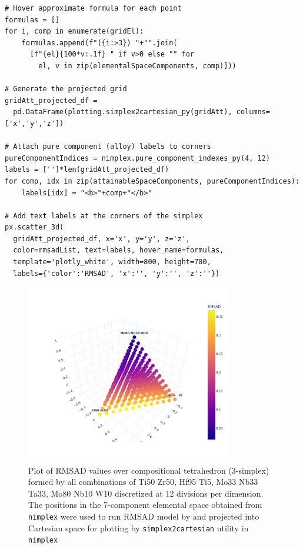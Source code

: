 \begin{verbatim}
# Hover approximate formula for each point
formulas = []
for i, comp in enumerate(gridEl):
    formulas.append(f"({i:>3}) "+"".join(
      [f"{el}{100*v:.1f} " if v>0 else "" for 
        el, v in zip(elementalSpaceComponents, comp)]))

# Generate the projected grid
gridAtt_projected_df = 
  pd.DataFrame(plotting.simplex2cartesian_py(gridAtt), columns=['x','y','z'])

# Attach pure component (alloy) labels to corners
pureComponentIndices = nimplex.pure_component_indexes_py(4, 12)
labels = ['']*len(gridAtt_projected_df)
for comp, idx in zip(attainableSpaceComponents, pureComponentIndices):
    labels[idx] = "<b>"+comp+"</b>"

# Add text labels at the corners of the simplex
px.scatter_3d(
  gridAtt_projected_df, x='x', y='y', z='z', 
  color=rmsadList, text=labels, hover_name=formulas,
  template='plotly_white', width=800, height=700, 
  labels={'color':'RMSAD', 'x':'', 'y':'', 'z':''})
\end{verbatim}

\begin{figure}[H]
    \centering
    \includegraphics[width=0.8\textwidth]{nimplextutorial2/02.AdditiveManufacturingPathPlanning_11_0.pdf}
    \caption{Plot of RMSAD values over compositional tetrahedron (3-simplex) formed by all combinations of Ti50 Zr50, Hf95 Ti5, Mo33 Nb33 Ta33, Mo80 Nb10 W10 discretized at 12 divisions per dimension. The positions in the 7-component elemental space obtained from \texttt{nimplex} \cite{Krajewski2024Nimplex} were used to run RMSAD model by \cite{Tandoc2023MiningAlloys} and projected into Cartesian space for plotting by \texttt{simplex2cartesian} utility in \texttt{nimplex}}
    \label{nimplextutorial2:fig:propertyfield}
\end{figure}

